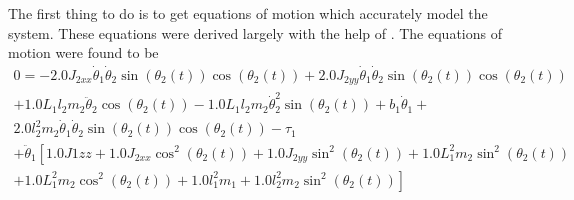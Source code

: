 \documentclass[letterpaper,10pt,oneside]{article}
\begin{document}
The first thing to do is to get equations of motion which accurately model the system. These equations were derived largely with the help of \cite{DYNAMICS}. The equations of motion were found to be \\




\begin{multline}
  0 = - 2.0 J_{2xx} \dot{\theta}_{1} \dot{\theta}_{2} \sin{\left(\theta_{2}{\left(t \right)} \right)} \cos{\left(\theta_{2}{\left(t \right)} \right)} + 2.0 J_{2yy} \dot{\theta}_{1} \dot{\theta}_{2} \sin{\left(\theta_{2}{\left(t \right)} \right)} \cos{\left(\theta_{2}{\left(t \right)} \right)}
        \\
   + 1.0 L_{1} l_{2} m_{2} \ddot{\theta}_{2} \cos{\left(\theta_{2}{\left(t \right)} \right)} - 1.0 L_{1} l_{2} m_{2} \dot{\theta}_{2}^{2} \sin{\left(\theta_{2}{\left(t \right)} \right)} + b_{1} \dot{\theta}_{1} + \\ 2.0 l_{2}^{2} m_{2} \dot{\theta}_{1} \dot{\theta}_{2} \sin{\left(\theta_{2}{\left(t \right)} \right)} \cos{\left(\theta_{2}{\left(t \right)} \right)} - \tau_{1}
    \\
    + \ddot{\theta}_{1} \left[1.0 J1zz + 1.0 J_{2xx} \cos^{2}{\left(\theta_{2}{\left(t \right)} \right)} + 1.0 J_{2yy} \sin^{2}{\left(\theta_{2}{\left(t \right)} \right)} + 1.0 L_{1}^{2} m_{2} \sin^{2}{\left(\theta_{2}{\left(t \right)} \right)}
      \right.
      \\
      \left.
     + 1.0 L_{1}^{2} m_{2} \cos^{2}{\left(\theta_{2}{\left(t \right)} \right)} + 1.0 l_{1}^{2} m_{1} + 1.0 l_{2}^{2} m_{2} \sin^{2}{\left(\theta_{2}{\left(t \right)} \right)}\right]
\end{multline}
\end{document}
